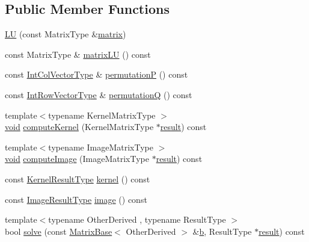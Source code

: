 \subsection*{Public Member Functions}
\begin{DoxyCompactItemize}
\item 
\hyperlink{class_l_u_aaeed97c71a99ce064ed6f2b503218907}{L\-U} (const Matrix\-Type \&\hyperlink{glext_8h_a7b24a3f2f56eb1244ae69dacb4fecb6f}{matrix})
\item 
const Matrix\-Type \& \hyperlink{class_l_u_a502973e871891b161b1cc66f105728cc}{matrix\-L\-U} () const 
\item 
const \hyperlink{class_l_u_a830b9928b7aed0f3b0147dd0aa6b8f2e}{Int\-Col\-Vector\-Type} \& \hyperlink{class_l_u_a734b5fd0ec8281e6985e2a90bc1e1570}{permutation\-P} () const 
\item 
const \hyperlink{class_l_u_a8b1b7e093c9203820f5e557b9e0c4edf}{Int\-Row\-Vector\-Type} \& \hyperlink{class_l_u_afb01cfd53e082fb9a7d371766b50ef96}{permutation\-Q} () const 
\item 
{\footnotesize template$<$typename Kernel\-Matrix\-Type $>$ }\\\hyperlink{group___u_a_v_objects_plugin_ga444cf2ff3f0ecbe028adce838d373f5c}{void} \hyperlink{class_l_u_ae15a7528f85589b1494cdf4d12312b59}{compute\-Kernel} (Kernel\-Matrix\-Type $\ast$\hyperlink{qxtslotjob_8h_aab161efab0511ea9612b64c40e9852ca}{result}) const 
\item 
{\footnotesize template$<$typename Image\-Matrix\-Type $>$ }\\\hyperlink{group___u_a_v_objects_plugin_ga444cf2ff3f0ecbe028adce838d373f5c}{void} \hyperlink{class_l_u_a31aedc3a457bdbb5f5d07c8bf07464da}{compute\-Image} (Image\-Matrix\-Type $\ast$\hyperlink{qxtslotjob_8h_aab161efab0511ea9612b64c40e9852ca}{result}) const 
\item 
const \hyperlink{class_l_u_a54c6b7bc8df14bc6d50249256a996e6f}{Kernel\-Result\-Type} \hyperlink{class_l_u_af6f47fa3872cd3e7931ef553e862202d}{kernel} () const 
\item 
const \hyperlink{class_l_u_a0c18d8a15aeec09772ef473875c03b2b}{Image\-Result\-Type} \hyperlink{class_l_u_a2c7e6a983dc0e0aad12040a653e05529}{image} () const 
\item 
{\footnotesize template$<$typename Other\-Derived , typename Result\-Type $>$ }\\bool \hyperlink{class_l_u_a69ac8b255d9d1d953cd6006ab96f2cd0}{solve} (const \hyperlink{class_matrix_base}{Matrix\-Base}$<$ Other\-Derived $>$ \&\hyperlink{glext_8h_a6eba317e3cf44d6d26c04a5a8f197dcb}{b}, Result\-Type $\ast$\hyperlink{qxtslotjob_8h_aab161efab0511ea9612b64c40e9852ca}{result}) const 

\end{DoxyCompactItemize}
